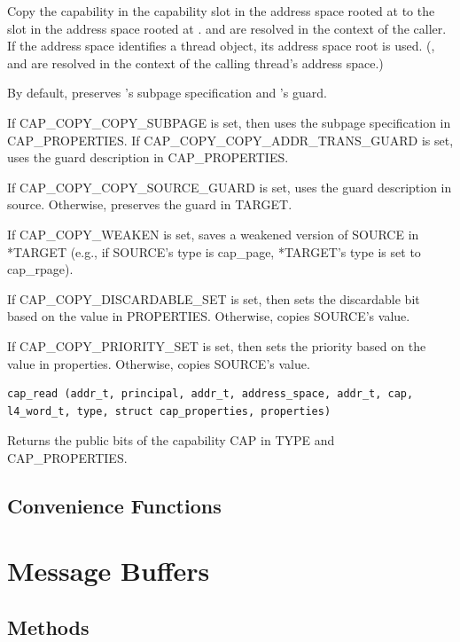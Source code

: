 Copy the capability in the capability slot  in the address
space rooted at  to the slot 
in the address space rooted at .
 and  are
resolved in the context of the caller.  If the address space
identifies a thread object, its address space root is used.
(,  and
 are resolved in the context of the
calling thread's address space.)

By default, preserves 's subpage specification and
's guard.

If CAP\_COPY\_COPY\_SUBPAGE is set, then uses the subpage
specification in CAP\_PROPERTIES.  If CAP\_COPY\_COPY\_ADDR\_TRANS\_GUARD
is set, uses the guard description in CAP\_PROPERTIES.

If CAP\_COPY\_COPY\_SOURCE\_GUARD is set, uses the guard description in
source.  Otherwise, preserves the guard in TARGET.

If CAP\_COPY\_WEAKEN is set, saves a weakened version of SOURCE in
*TARGET (e.g., if SOURCE's type is cap\_page, *TARGET's type is set
to cap\_rpage).

If CAP\_COPY\_DISCARDABLE\_SET is set, then sets the discardable bit
based on the value in PROPERTIES.  Otherwise, copies SOURCE's
value.

If CAP\_COPY\_PRIORITY\_SET is set, then sets the priority based on
the value in properties.  Otherwise, copies SOURCE's value.


\begin{lstlisting}
cap_read (addr_t, principal, addr_t, address_space, addr_t, cap,
l4_word_t, type, struct cap_properties, properties)
\end{lstlisting}

Returns the public bits of the capability CAP in TYPE and
CAP\_PROPERTIES.

\subsection{Convenience Functions}

\clearpage
\section{Message Buffers}

\subsection{Methods}

